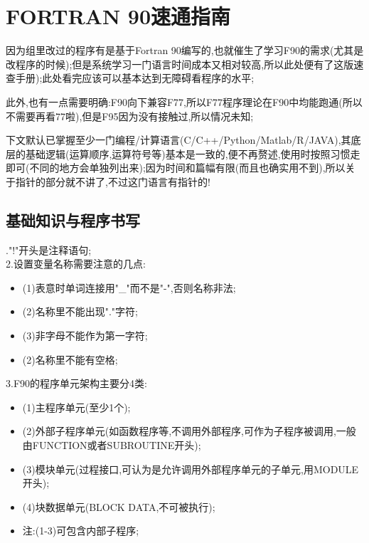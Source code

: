\chapter{FORTRAN 90速通指南}

因为组里改过的程序有是基于Fortran 90编写的,也就催生了学习F90的需求(尤其是改程序的时候);但是系统学习一门语言时间成本又相对较高,所以此处便有了这版速查手册);此处看完应该可以基本达到无障碍看程序的水平;\par

此外,也有一点需要明确:F90向下兼容F77,所以F77程序理论在F90中均能跑通(所以不需要再看77啦),但是F95因为没有接触过,所以情况未知;\par

下文默认已掌握至少一门编程/计算语言(C/C++/Python/Matlab/R/JAVA),其底层的基础逻辑(运算顺序,运算符号等)基本是一致的,便不再赘述,使用时按照习惯走即可(不同的地方会单独列出来);因为时间和篇幅有限(而且也确实用不到),所以关于指针的部分就不讲了,不过这门语言有指针的!



\section{基础知识与程序书写}
."!"开头是注释语句;\\
2.设置变量名称需要注意的几点:
\begin{itemize}
	\item{(1)表意时单词连接用"\_"而不是"-",否则名称非法;}
	\item{(2)名称里不能出现"."字符;}
	\item{(3)非字母不能作为第一字符;}
	\item{(2)名称里不能有空格;}
\end{itemize}

\noindent
3.F90的程序单元架构主要分4类:
\begin{itemize}
	\item{(1)主程序单元(至少1个);}
	\item{(2)外部子程序单元(如函数程序等,不调用外部程序,可作为子程序被调用,一般由FUNCTION或者SUBROUTINE开头);}
	\item{(3)模块单元(过程接口,可认为是允许调用外部程序单元的子单元,用MODULE开头);}
	\item{(4)块数据单元(BLOCK DATA,不可被执行);}
	\item{注:(1-3)可包含内部子程序;}
\end{itemize}


